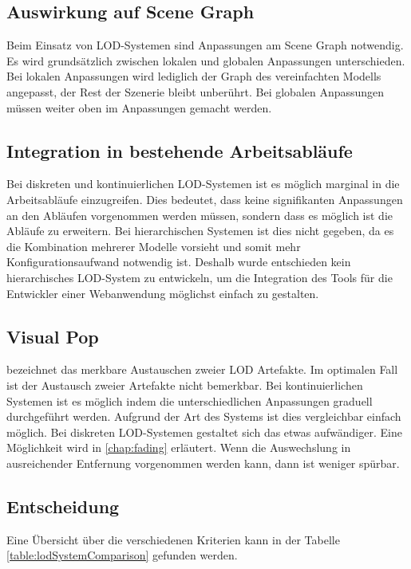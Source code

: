 \subsection{Auswirkung auf Scene Graph}
Beim Einsatz von LOD-Systemen sind Anpassungen am \gls{Scene Graph} notwendig. Es wird grundsätzlich zwischen lokalen und globalen Anpassungen unterschieden. Bei lokalen Anpassungen wird lediglich der Graph des vereinfachten Modells angepasst, der Rest der Szenerie bleibt unberührt. Bei globalen Anpassungen müssen weiter oben im  Anpassungen gemacht werden.

\subsection{Integration in bestehende Arbeitsabläufe}

Bei diskreten und kontinuierlichen LOD-Systemen ist es möglich marginal in die Arbeitsabläufe einzugreifen. Dies bedeutet, dass keine signifikanten Anpassungen an den Abläufen vorgenommen werden müssen, sondern dass es möglich ist die Abläufe zu erweitern.
Bei hierarchischen Systemen ist dies nicht gegeben, da es die Kombination mehrerer Modelle vorsieht und somit mehr Konfigurationsaufwand notwendig ist.
Deshalb wurde entschieden kein hierarchisches LOD-System zu entwickeln, um die Integration des Tools für die Entwickler einer Webanwendung möglichst einfach zu gestalten.

\subsection{Visual Pop}
 bezeichnet das merkbare Austauschen zweier LOD Artefakte. Im optimalen Fall ist der Austausch zweier Artefakte nicht bemerkbar. Bei kontinuierlichen Systemen ist es möglich indem die unterschiedlichen Anpassungen graduell durchgeführt werden. Aufgrund der Art des Systems ist dies vergleichbar einfach möglich. Bei diskreten LOD-Systemen gestaltet sich das etwas aufwändiger. Eine Möglichkeit wird in \autoref{chap:fading} erläutert. Wenn die Auswechslung in ausreichender Entfernung vorgenommen werden kann, dann ist  weniger spürbar. 

\subsection{Entscheidung}
Eine Übersicht über die verschiedenen Kriterien kann in der Tabelle \ref{table:lodSystemComparison} gefunden werden.

